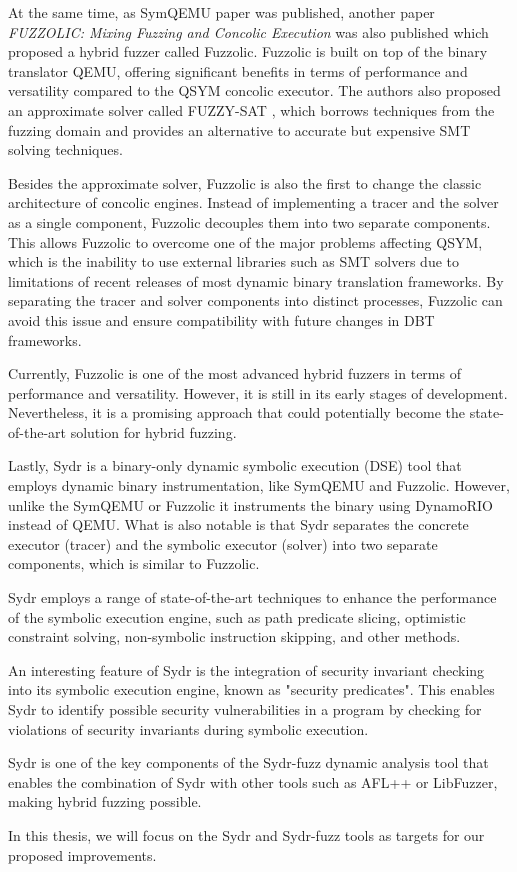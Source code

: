 
At the same time, as SymQEMU paper was published, another paper \textit{FUZZOLIC: Mixing Fuzzing and Concolic Execution} \cite{fuzzolic-hybrid-fuzzer} was also published which proposed a hybrid fuzzer called Fuzzolic. Fuzzolic is built on top of the binary translator QEMU, offering significant benefits in terms of performance and versatility compared to the QSYM concolic executor. The authors also proposed an approximate solver called FUZZY-SAT \cite{fuzzy-sat-fuzzing-symbolic-expressions}, which borrows techniques from the fuzzing domain and provides an alternative to accurate but expensive SMT solving techniques.

Besides the approximate solver, Fuzzolic is also the first to change the classic architecture of concolic engines. Instead of implementing a tracer and the solver as a single component, Fuzzolic decouples them into two separate components. This allows Fuzzolic to overcome one of the major problems affecting QSYM, which is the inability to use external libraries such as SMT solvers due to limitations of recent releases of most dynamic binary translation frameworks. By separating the tracer and solver components into distinct processes, Fuzzolic can avoid this issue and ensure compatibility with future changes in DBT frameworks.

Currently, Fuzzolic is one of the most advanced hybrid fuzzers in terms of performance and versatility. However, it is still in its early stages of development. Nevertheless, it is a promising approach that could potentially become the state-of-the-art solution for hybrid fuzzing.


Lastly, Sydr \cite{sydr-cutting-edge-dynamic-symbolic-execution} is a binary-only dynamic symbolic execution (DSE) tool that employs dynamic binary instrumentation, like SymQEMU and Fuzzolic. However, unlike the SymQEMU or Fuzzolic it instruments the binary using DynamoRIO instead of QEMU. What is also notable is that Sydr separates the concrete executor (tracer) and the symbolic executor (solver) into two separate components, which is similar to Fuzzolic.

Sydr employs a range of state-of-the-art techniques to enhance the performance of the symbolic execution engine, such as path predicate slicing, optimistic constraint solving, non-symbolic instruction skipping, and other methods.

An interesting feature of Sydr is the integration of security invariant checking into its symbolic execution engine, known as "security predicates". This enables Sydr to identify possible security vulnerabilities in a program by checking for violations of security invariants during symbolic execution.

Sydr is one of the key components of the Sydr-fuzz \cite{sydr-fuzz-ispras-2022} dynamic analysis tool that enables the combination of Sydr with other tools such as AFL++ or LibFuzzer, making hybrid fuzzing possible.

In this thesis, we will focus on the Sydr and Sydr-fuzz tools as targets for our proposed improvements.
